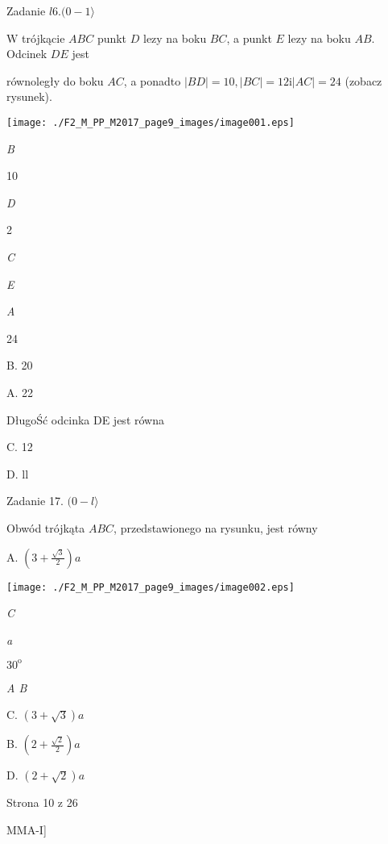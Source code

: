 \documentclass[a4paper,12pt]{article}
\begin{document}
Zadanie $l6. (0-1\rangle$

$\mathrm{W}$ trójkącie $ABC$ punkt $D$ lezy na boku $BC$, a punkt $E$ lezy na boku $AB$. Odcinek $DE$ jest

równoległy do boku $AC$, a ponadto $|BD|=10, |BC|=12 \mathrm{i}|AC|=24$ (zobacz rysunek).
\begin{center}
\texttt{[image: ./F2\_M\_PP\_M2017\_page9\_images/image001.eps]}
\end{center}
{\it B}

10

{\it D}

2

{\it C}

{\it E}

{\it A}

24

B. 20

A. 22

DługoŚć odcinka DE jest równa

C. 12

D. ll

Zadanie 17. $(0-l\rangle$

Obwód trójkąta $ABC$, przedstawionego na rysunku, jest równy

A. $(3+\displaystyle \frac{\sqrt{3}}{2})a$
\begin{center}
\texttt{[image: ./F2\_M\_PP\_M2017\_page9\_images/image002.eps]}
\end{center}
{\it C}

{\it a}

$30^{\mathrm{o}}$

{\it A  B}

C. $(3+\sqrt{3})a$

B. $(2+\displaystyle \frac{\sqrt{2}}{2})a$

D. $(2+\sqrt{2})a$

Strona 10 z 26

MMA-I]
\end{document}
